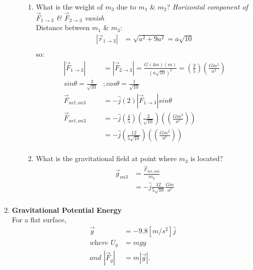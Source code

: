 \documentclass{article}
\begin{document}
\begin{enumerate}
\begin{enumerate}
        \begin{enumerate}
            \item{What is the weight of $m_3$ due to $m_1$ \& $m_2$?}
            \textit{Horizontal component of $\vec{F}_{1\rightarrow3}$ \& $\vec{F}_{2\rightarrow3}$ vanish} \\
            Distance between $m_1$ \& $m_3$:
            \begin{align*}
                |\vec{r}_{1\rightarrow3}|&=\sqrt{a^2+9a^2}=a\sqrt{10} \\
            \end{align*}
            so: \\
            \begin{align*}
                |\vec{F}_{1\rightarrow3}|&=|\vec{F}_{2\rightarrow3}|=\frac{G(4m)(m)}{(a\sqrt{10})^2}=(\frac{2}{5})(\frac{Gm^2}{a^2}) \\
                sin\theta=\frac{3}{\sqrt{10}}&;cos\theta=\frac{1}{\sqrt{10}} \\
                \vec{F}_{net,on3}&=-\hat{j}(2)|\vec{F}_{1\rightarrow3}|sin\theta \\
                \vec{F}_{net,on3}&=-\hat{j}(\frac{4}{5})(\frac{3}{\sqrt{10}})((\frac{Gm^2}{a^2})) \\
                &=-\hat{j}(\frac{12}{5\sqrt{10}})((\frac{Gm^2}{a^2})) \\
            \end{align*}
            \item{What is the gravitational field at point where $m_3$ is located?}
            \begin{align*}
                \vec{g}_{on3}&=\frac{\vec{F}_{net,on3}}{m_3} \\
                &=-\hat{j}\frac{12}{5\sqrt{10}}\frac{Gm}{a^2} \\
            \end{align*}
        \end{enumerate}
    \end{enumerate}
    \item \textbf{Gravitational Potential Energy} \\
    For a flat surface, \\
    \begin{align*}
        \vec{g}&=-9.8[m/s^2]\hat{j} \\
        \textit{where }U_g&=mgy \\
        \textit{and }|\vec{F}_g|&=m|\vec{g}|. \\
    \end{align*}

\end{enumerate}
\end{document}
